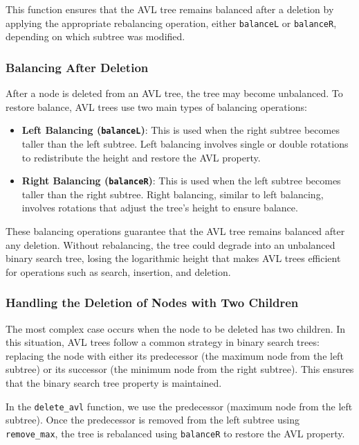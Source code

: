 This function ensures that the AVL tree remains balanced after a deletion by applying the appropriate rebalancing operation, either \texttt{balanceL} or \texttt{balanceR}, depending on which subtree was modified.

\subsubsection{Balancing After Deletion}

After a node is deleted from an AVL tree, the tree may become unbalanced. To restore balance, AVL trees use two main types of balancing operations:
\begin{itemize}
    \item \textbf{Left Balancing (\texttt{balanceL})}: This is used when the right subtree becomes taller than the left subtree. Left balancing involves single or double rotations to redistribute the height and restore the AVL property.
    \item \textbf{Right Balancing (\texttt{balanceR})}: This is used when the left subtree becomes taller than the right subtree. Right balancing, similar to left balancing, involves rotations that adjust the tree's height to ensure balance.
\end{itemize}

These balancing operations guarantee that the AVL tree remains balanced after any deletion. Without rebalancing, the tree could degrade into an unbalanced binary search tree, losing the logarithmic height that makes AVL trees efficient for operations such as search, insertion, and deletion.

\subsubsection{Handling the Deletion of Nodes with Two Children}

The most complex case occurs when the node to be deleted has two children. In this situation, AVL trees follow a common strategy in binary search trees: replacing the node with either its predecessor (the maximum node from the left subtree) or its successor (the minimum node from the right subtree). This ensures that the binary search tree property is maintained.

In the \texttt{delete\_avl} function, we use the predecessor (maximum node from the left subtree). Once the predecessor is removed from the left subtree using \texttt{remove\_max}, the tree is rebalanced using \texttt{balanceR} to restore the AVL property.

